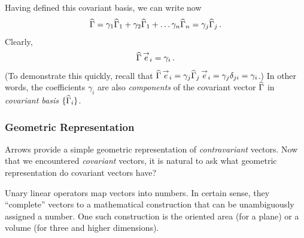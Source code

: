 Having defined this covariant basis, we can write now
\[
\widehat{\Gamma} = \gamma_1\widehat{\Gamma}_1 + \gamma_2\widehat{\Gamma}_1 + \ldots \gamma_n\widehat{\Gamma}_n=\gamma_j\widehat{\Gamma}_j\,.
\]
Clearly,
\[
\widehat{\Gamma}\,\overset{\rightarrow}{e}_i = \gamma_i\,.
\]
(To demonstrate this quickly, recall that
$\widehat{\Gamma}\,\overset{\rightarrow}{e}_i=\gamma_j\widehat{\Gamma}_j\,\overset{\rightarrow}{e}_i=\gamma_j\delta_{ji}=\gamma_i$.)
In other words, the coefficients $\gamma_i$ are also \emph{components}
of the covariant vector $\widehat{\Gamma}$ in \emph{covariant basis}
$\lbrace\widehat{\Gamma}_i\rbrace$.


\subsubsection*{Geometric Representation}
Arrows provide a simple geometric representation of
\emph{contravariant}
vectors. Now that we encountered \emph{covariant} vectors, it is
natural to ask what geometric representation do covariant vectors have?

Unary linear operators map vectors into numbers. In certain sense,
they ``complete'' vectors to a mathematical construction that can be
unambiguously assigned a number. One such construction is the oriented
area (for a plane) or a volume (for three and higher dimensions).

